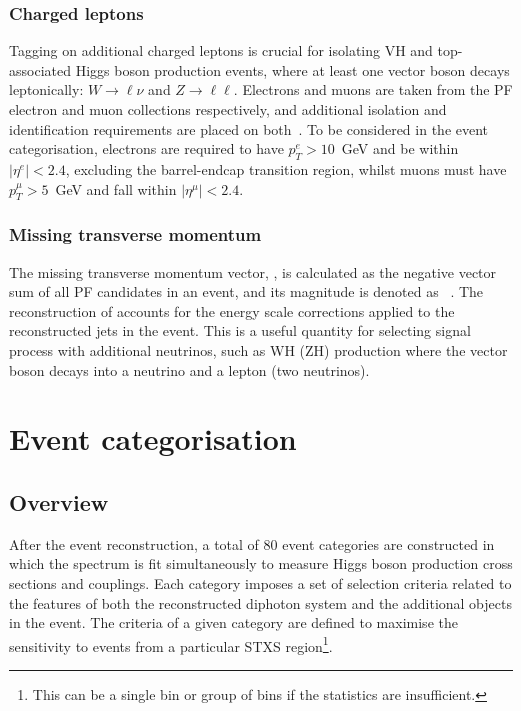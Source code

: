 \subsubsection{Charged leptons}
Tagging on additional charged leptons is crucial for isolating VH and top-associated Higgs boson production events, where at least one vector boson decays leptonically: $W\rightarrow\ell\nu$ and $Z\rightarrow\ell\ell$. Electrons and muons are taken from the PF electron and muon collections respectively, and additional isolation and identification requirements are placed on both~\cite{Khachatryan:2015hwa,Sirunyan:2018fpa}. To be considered in the event categorisation, electrons are required to have $p_T^e>10$~GeV and be within $|\eta^e|<2.4$, excluding the barrel-endcap transition region, whilst muons must have $p_T^\mu>5$~GeV and fall within $|\eta^\mu|<2.4$.

\subsubsection{Missing transverse momentum}
The missing transverse momentum vector, \metv, is calculated as the negative vector \pt sum of all PF candidates in an event, and its magnitude is denoted as \met~\cite{Sirunyan:2019kia}. The reconstruction of \metv accounts for the energy scale corrections applied to the reconstructed jets in the event. This is a useful quantity for selecting signal process with additional neutrinos, such as WH (ZH) production where the vector boson decays into a neutrino and a lepton (two neutrinos).

\section{Event categorisation}\label{sec:event_categorisation}

\subsection{Overview}
After the event reconstruction, a total of 80 event categories are constructed in which the \mgg spectrum is fit simultaneously to measure Higgs boson production cross sections and couplings. Each category imposes a set of selection criteria related to the features of both the reconstructed diphoton system and the additional objects in the event. The criteria of a given category are defined to maximise the sensitivity to events from a particular STXS region\footnote{This can be a single bin or group of bins if the statistics are insufficient.}.

